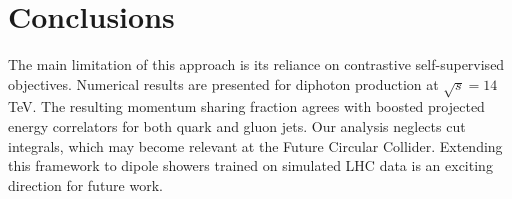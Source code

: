 \section{Conclusions}\label{sec:conclusions}

The main limitation of this approach is its reliance on contrastive
self-supervised objectives. Numerical results are presented for diphoton
production at $\sqrt{s} = 14$ TeV. The resulting momentum sharing
fraction agrees with boosted projected energy correlators for both quark
and gluon jets. Our analysis neglects cut integrals, which may become
relevant at the Future Circular Collider. Extending this framework to
dipole showers trained on simulated LHC data is an exciting direction
for future work.

